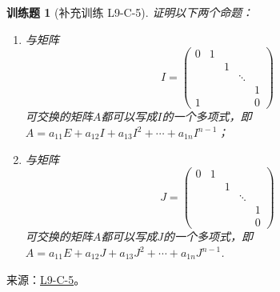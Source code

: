 \documentclass[12pt,fontset=fandol]{ctexart}
\newtheorem{exercise}{训练题}[section]
\begin{document}
\begin{exercise}[补充训练 L9-C-5]\label{prob:L9-C-5}
证明以下两个命题：
        \begin{enumerate}
            \item 与矩阵
\[I=\begin{pmatrix}
                          0 & 1 &   &        &   \\
                            &   & 1 &        &   \\
                            &   &   & \ddots &   \\
                            &   &   &        & 1 \\
                          1 &   &   &        & 0
                      \end{pmatrix}\]
可交换的矩阵$A$都可以写成$I$的一个多项式，即$A=a_{11}E+a_{12}I+a_{13}I^2+\cdots+a_{1n}I^{n-1}$；

            \item 与矩阵
\[J=\begin{pmatrix}
                          0 & 1 &   &        &   \\
                            &   & 1 &        &   \\
                            &   &   & \ddots &   \\
                            &   &   &        & 1 \\
                            &   &   &        & 0
                      \end{pmatrix}\]
可交换的矩阵$A$都可以写成$J$的一个多项式，即$A=a_{11}E+a_{12}J+a_{13}J^2+\cdots+a_{1n}J^{n-1}$.
        \end{enumerate}
\end{exercise}
\noindent 来源：\href{https://github.com/yhwu-is/Linear-Algebra-Left-Undone/blob/new/%E8%AE%B2%E4%B9%89/%E4%B8%93%E9%A2%98/9%20%E7%9F%A9%E9%98%B5%E8%BF%90%E7%AE%97%E8%BF%9B%E9%98%B6.tex}{L9-C-5}。
\end{document}
